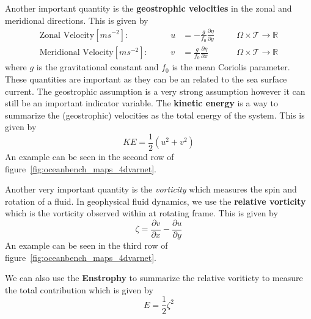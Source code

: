 Another important quantity is the \textbf{geostrophic velocities} in the zonal and meridional directions. This is given by
\begin{align}
	\text{Zonal Velocity}[ms^{-2}]:&& \quad
 u &= -\frac{g}{f_0}\frac{\partial \eta}{\partial y} &&
 \quad \Omega\times \mathcal{T}\rightarrow\mathbb{R} \label{eq:u_vel} \\
	\text{Meridional Velocity}[ms^{-2}]:&& \quad
 v &= \frac{g}{f_0}\frac{\partial \eta}{\partial x} &&
 \quad \Omega\times \mathcal{T}\rightarrow\mathbb{R} \label{eq:v_vel}
\end{align}
where $g$ is the gravitational constant and $f_0$ is the mean Coriolis parameter. These quantities are important as they can be an related to the sea surface current. The geostrophic assumption is a very strong assumption however it can still be an important indicator variable. The \textbf{kinetic energy} is a way to summarize the (geostrophic) velocities as the total energy of the system. This is given by
\begin{equation} \label{eq:kineticenergy}
    KE = \frac{1}{2}\left(u^2 + v^2\right)
\end{equation}
An example can be seen in the second row of figure~\ref{fig:oceanbench_maps_4dvarnet}.

Another very important quantity is the \textit{vorticity} which measures the spin and rotation of a fluid. In geophysical fluid dynamics, we use the \textbf{relative vorticity} which is the vorticity observed within at rotating frame.
This is given by
\begin{equation} \label{eq:relvorticity}
    \zeta = \frac{\partial v}{\partial x} - \frac{\partial u}{\partial y}
\end{equation}
An example can be seen in the third row of figure~\ref{fig:oceanbench_maps_4dvarnet}.



We can also use the \textbf{Enstrophy} to summarize the relative voriticty to measure the total contribution which is given by
\begin{equation} \label{eq:enstrophy}
    E = \frac{1}{2}\zeta^2
\end{equation}

